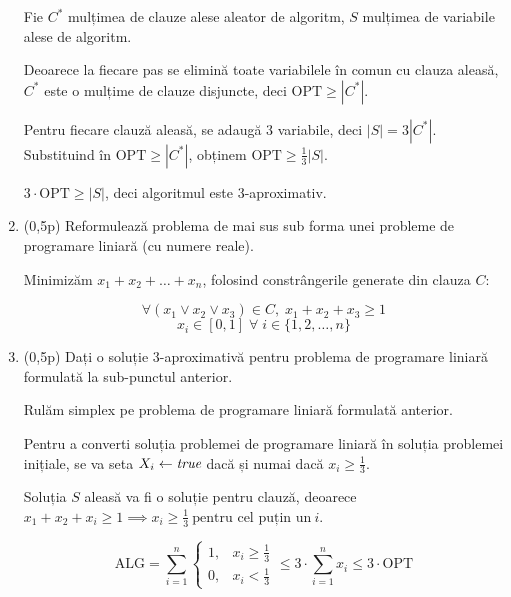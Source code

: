 \documentclass[a4paper,12pt]{article}
\newcommand*{\OPT}{\text{OPT}}
\newcommand*{\ALG}{\text{ALG}}
\begin{document}
\begin{enumerate}[label=\alph*)]
Fie $C^*$ mulțimea de clauze alese aleator de algoritm, $S$ mulțimea de variabile alese de algoritm.

Deoarece la fiecare pas se elimină toate variabilele în comun cu clauza aleasă,
$C^*$ este o mulțime de clauze disjuncte, deci $\OPT \geq |C^*|$.

Pentru fiecare clauză aleasă, se adaugă $3$ variabile, deci $|S| = 3|C^*|$.
Substituind în $\OPT \geq |C^*|$, obținem $\OPT \geq \frac{1}{3}|S|$.

$3 \cdot \OPT \geq |S|$, deci algoritmul este 3-aproximativ.

\item (0,5p) Reformulează problema de mai sus sub forma unei probleme de programare liniară (cu numere reale).

Minimizăm $x_1 + x_2 + \dots + x_n$, folosind constrângerile generate din clauza $C$:

\[\forall (x_1 \lor x_2 \lor x_3) \in C,\; x_1 + x_2 + x_3 \geq 1\]
\[x_i \in [0, 1] \;\forall\; i \in \{1, 2, \dots, n\}\]

\item (0,5p) Dați o soluție 3-aproximativă pentru problema de programare liniară formulată la sub-punctul anterior.

Rulăm simplex pe problema de programare liniară formulată anterior.

Pentru a converti soluția problemei de programare liniară în soluția problemei inițiale,
se va seta $X_i \leftarrow \text{\it{true}}$ dacă și numai dacă $x_i \geq \frac{1}{3}$.

Soluția $S$ aleasă va fi o soluție pentru clauză, deoarece
$x_1 + x_2 + x_i \geq 1 \implies x_i \geq \frac{1}{3}\ \text{pentru cel puțin un}\ i$.

\[
\ALG = \sum_{i=1}^{n}\begin{cases}
    1, & x_i \geq \frac{1}{3} \\
    0, & x_i < \frac{1}{3}
\end{cases}
\leq 3 \cdot \sum_{i=1}^{n} x_i
\leq 3 \cdot \OPT
\]

\end{enumerate}
\end{document}
